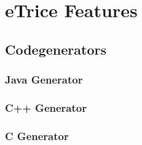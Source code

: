 \chapter{eTrice Features}

\section{Codegenerators}

\subsection{Java Generator}

\subsection{C++ Generator}

\subsection{C Generator}

